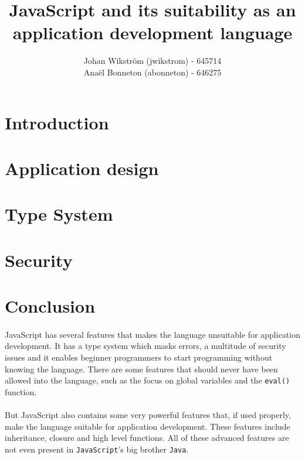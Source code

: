 \documentclass{report}
\title{JavaScript and its suitability as an application development language}
\author{Johan Wikström (jwikstrom) - 645714\\
Anaël Bonneton (abonneton) - 646275 
}
\begin{document}
\maketitle
\tableofcontents

\section{Introduction}


\section{Application design}


\section{Type System}


\section{Security}




\section{Conclusion}
\paragraph{}
JavaScript has several features that makes the language unsuitable for application development. It has a type system which masks errors, a multitude of security issues and it enables beginner programmers to start programming without knowing the language. There are some features that should never have been allowed into the language, such as the focus on global variables and the \texttt{eval()} function.
\paragraph{}
But JavaScript also contains some very powerful features that, if used properly, make the language suitable for application development. These features include inheritance, closure and high level functions. All of these advanced features are not even present in \texttt{JavaScript}'s big brother \texttt{Java}.
\end{document}
